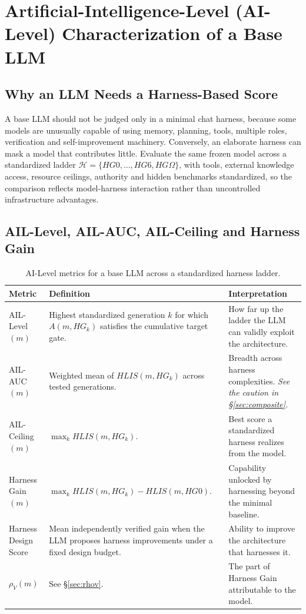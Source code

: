 \documentclass[11pt]{article}
\theoremstyle{definition}
\newcommand{\Om}{\ensuremath{\Omega}}
\newcommand{\rhov}{\ensuremath{\rho_V}}
\begin{document}
\section{Artificial-Intelligence-Level (AI-Level) Characterization of a Base LLM}

\subsection{Why an LLM Needs a Harness-Based Score}

A base LLM should not be judged only in a minimal chat harness, because some models are unusually capable of using memory, planning, tools, multiple roles, verification and self-improvement machinery. Conversely, an elaborate harness can mask a model that contributes little. Evaluate the same frozen model across a standardized ladder $\mathcal{H} = \{HG0, \ldots, HG6, HG\Om{}\}$, with tools, external knowledge access, resource ceilings, authority and hidden benchmarks standardized, so the comparison reflects model-harness interaction rather than uncontrolled infrastructure advantages.

\subsection{AIL-Level, AIL-AUC, AIL-Ceiling and Harness Gain}

\begin{table}[!htbp]
\centering\small
\begin{tabularx}{\textwidth}{@{}lYY@{}}
\toprule
Metric & Definition & Interpretation \\
\midrule
AIL-Level$(m)$ & Highest standardized generation $k$ for which $A(m,HG_k)$ satisfies the cumulative target gate. & How far up the ladder the LLM can validly exploit the architecture. \\
AIL-AUC$(m)$ & Weighted mean of $HLIS(m,HG_k)$ across tested generations. & Breadth across harness complexities. \emph{See the caution in \S\ref{sec:composite}.} \\
AIL-Ceiling$(m)$ & $\max_k HLIS(m,HG_k)$. & Best score a standardized harness realizes from the model. \\
Harness Gain$(m)$ & $\max_k HLIS(m,HG_k) - HLIS(m,HG0)$. & Capability unlocked by harnessing beyond the minimal baseline. \\
Harness Design Score & Mean independently verified gain when the LLM proposes harness improvements under a fixed design budget. & Ability to improve the architecture that harnesses it. \\
\textbf{$\rhov{}(m)$} & See \S\ref{sec:rhov}. & The part of Harness Gain attributable to the model. \\
\bottomrule
\end{tabularx}
\caption{AI-Level metrics for a base LLM across a standardized harness ladder.}
\label{tab:hilmetrics}
\end{table}
\end{document}
